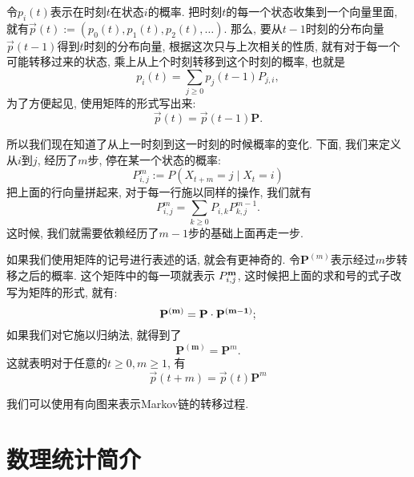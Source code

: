 令$p_i(t)$表示在时刻$t$在状态$i$的概率. 把时刻$t$的每一个状态收集到一个向量里面, 就有$\vec{p}(t):=\left(p_0(t), p_1(t), p_2(t), \ldots\right)$. 那么, 要从$t-1$时刻的分布向量$\vec{p}(t-1)$得到$t$时刻的分布向量, 根据这次只与上次相关的性质, 就有对于每一个可能转移过来的状态, 乘上从上个时刻转移到这个时刻的概率, 也就是$$p_i(t)=\sum_{j \geq 0} p_j(t-1) P_{j, i},$$ 为了方便起见, 使用矩阵的形式写出来: $$\vec{p}(t)=\vec{p}(t-1) \mathbf{P}.$$

所以我们现在知道了从上一时刻到这一时刻的时候概率的变化. 下面, 我们来定义从$i$到$j$, 经历了$m$步, 停在某一个状态的概率: 
$$
P_{i, j}^m:={P}\left(X_{t+m}=j \mid X_t=i\right)
$$
把上面的行向量拼起来, 对于每一行施以同样的操作, 我们就有$$P_{i, j}^m=\sum_{k \geq 0} P_{i, k} P_{k, j}^{m-1}. $$ 这时候, 我们就需要依赖经历了$m-1$步的基础上面再走一步. 

如果我们使用矩阵的记号进行表述的话, 就会有更神奇的. 令$\mathbf{P}^{({m})}$表示经过$m$步转移之后的概率. 这个矩阵中的每一项就表示
$P_{i, j}^{\bf{m}}$, 这时候把上面的求和号的式子改写为矩阵的形式, 就有: 
$$
\mathbf{P}^{(\bf {m})}=\mathbf{P} \cdot \mathbf{P}^{(\bf {m}-1)} ;
$$
如果我们对它施以归纳法, 就得到了$$
\mathbf{P}^{(\mathbf{m})}=\mathbf{P}^{{m}}.
$$
这就表明对于任意的$t\geq 0, m\geq 1$, 有
$$
\vec{p}(t+m)=\vec{p}(t) \mathbf{P}^{{m}}
$$

我们可以使用有向图来表示Markov链的转移过程. 


\part{数理统计简介}










